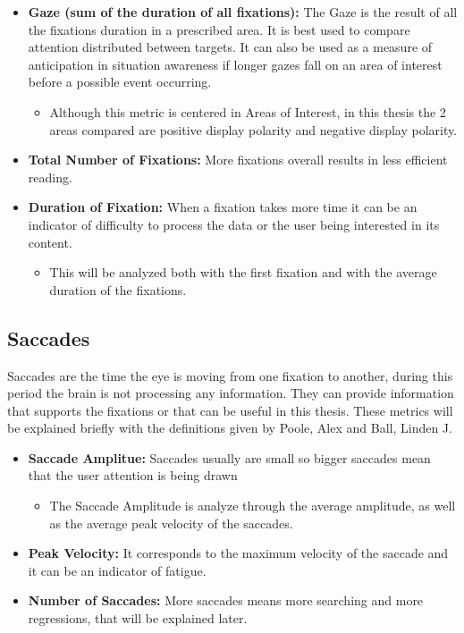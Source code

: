 \begin{itemize}
    \item \textbf{Gaze (sum of the duration of all fixations):} The Gaze is the result of all the fixations duration in a prescribed area.
    It is best used to compare attention distributed between targets. It can 
    also be used as a measure of anticipation in situation awareness if longer gazes fall on an area of 
    interest before a possible event occurring. \cite{Poole2006}
    \begin{itemize}
        \item Although this metric is centered in Areas of Interest, in this thesis the 2 areas compared are
        positive display polarity and negative display polarity.
    \end{itemize}
    \item \textbf{Total Number of Fixations:} More fixations overall results in less efficient reading.
    \item \textbf{Duration of Fixation:} When a fixation takes more time it can be an indicator of difficulty to process the data
    or the user being interested in its content.
    \begin{itemize}
        \item This will be analyzed both with the first fixation and with the average duration of the fixations.
    \end{itemize}
\end{itemize}
\subsection{Saccades}
Saccades are the time the eye is moving from one fixation to another, during this period the brain is not 
processing any information. They can provide information that supports the fixations or that can be useful 
in this thesis. These metrics will be explained briefly with the definitions given by Poole, Alex and Ball, 
Linden J.\cite{Poole2006}
\begin{itemize}
    \item \textbf{Saccade Amplitue:} Saccades usually are small so bigger saccades mean that the user attention is being drawn
        \begin{itemize}
            \item The Saccade Amplitude is analyze through the average amplitude, 
            as well as the average peak velocity of the saccades.
        \end{itemize}
    \item \textbf{Peak Velocity:} It corresponds to the maximum velocity of the saccade and it can be an indicator of fatigue.
    \item \textbf{Number of Saccades:} More saccades means more searching and more regressions, that will be explained later.
\end{itemize}

